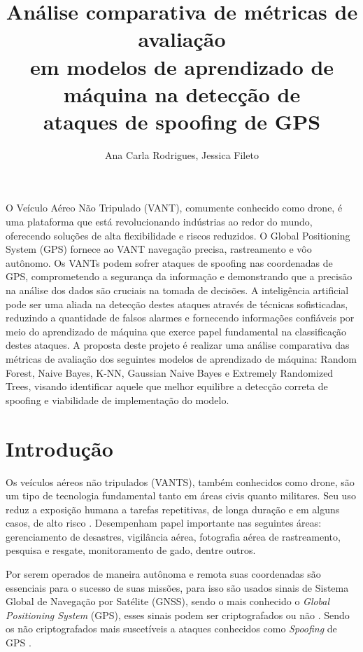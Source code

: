 \documentclass[12pt]{article}
\title{Análise comparativa de métricas de avaliação\\
em modelos de aprendizado de máquina na detecção de\\
ataques de spoofing de GPS
}
\author{Ana Carla Rodrigues\inst{1}, Jessica Fileto\inst{1}}
\begin{document}
\maketitle
     
\begin{resumo} 
O Veículo Aéreo Não Tripulado (VANT), comumente conhecido como drone, é uma
plataforma que está revolucionando indústrias ao redor do mundo, oferecendo 
soluções de alta flexibilidade e riscos reduzidos. O Global Positioning System 
(GPS) fornece ao VANT navegação precisa, rastreamento e vôo autônomo. Os VANTs 
podem sofrer ataques de spoofing nas coordenadas de GPS, comprometendo a 
segurança da informação e demonstrando que a precisão na análise dos dados são 
cruciais na tomada de decisões. A inteligência artificial pode ser uma aliada 
na detecção destes ataques através de técnicas sofisticadas, reduzindo a 
quantidade de falsos alarmes e fornecendo informações confiáveis por meio do 
aprendizado de máquina que exerce papel fundamental na classificação destes 
ataques. A proposta deste projeto é realizar uma análise comparativa das 
métricas de avaliação dos seguintes modelos de aprendizado de máquina:
Random Forest, Naive Bayes, K-NN, Gaussian Naive Bayes e Extremely Randomized Trees,
visando identificar aquele que melhor equilibre a detecção correta
de spoofing e viabilidade de implementação do modelo.
\end{resumo}

\section{Introdução}

Os veículos aéreos não tripulados (VANTS), também conhecidos como drone,
são um tipo de tecnologia fundamental tanto em áreas civis quanto militares.
Seu uso reduz a exposição humana a tarefas repetitivas, de longa duração
e em alguns casos, de alto risco \cite{dialogos}.
Desempenham papel importante nas seguintes áreas: gerenciamento de desastres,
vigilância aérea, fotografia aérea de rastreamento, pesquisa e resgate,
monitoramento de gado, dentre outros. \cite{titounaLightweightSecurityTechnique2021} 

Por serem operados de maneira autônoma e remota suas coordenadas são essenciais
para o sucesso de suas missões, para isso são usados sinais
de Sistema Global de Navegação por Satélite (GNSS),
sendo o mais conhecido o \textit{Global Positioning System} (GPS),
esses sinais podem ser criptografados ou não \cite {lester}.
Sendo os não criptografados mais suscetíveis a ataques conhecidos como
\textit{Spoofing} de GPS \cite{srinivasansGPSSpoofingDetection2023}. 
\end{document}
